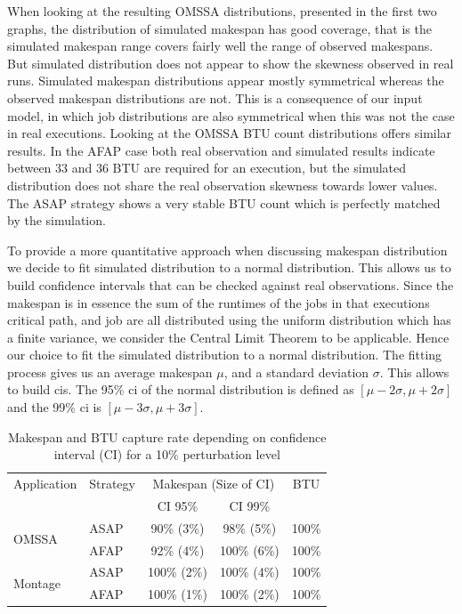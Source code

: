 \documentclass[10pt,conference,compsocconf]{IEEEtran}
\begin{document}
When looking at the resulting OMSSA distributions, presented in the first two
graphs, the distribution of simulated makespan has good coverage, that is the
simulated makespan range covers fairly well the range of observed makespans. But
simulated distribution does not appear to show the skewness observed in real
runs. Simulated makespan distributions appear mostly symmetrical whereas the
observed makespan distributions are not. This is a consequence of our input
model, in which job distributions are also symmetrical when this was not the
case in real executions. Looking at the OMSSA BTU count distributions offers
similar results.  In the AFAP case both real observation and simulated results
indicate between 33 and 36 BTU are required for an execution, but the simulated
distribution does not share the real observation skewness towards lower values.
The ASAP strategy shows a very stable BTU count which is perfectly matched by
the simulation.

To provide a more quantitative approach when discussing makespan distribution we
decide to fit simulated distribution to a normal distribution. This allows us to
build confidence intervals that can be checked against real observations.  Since
the makespan is in essence the sum of the runtimes of the jobs in that
executions critical path, and job are all distributed using the uniform
distribution which has a finite variance, we consider the Central Limit Theorem
to be applicable. Hence our choice to fit the simulated distribution to a normal
distribution. The fitting process gives us an average makespan $\mu{}$, and a
standard deviation $\sigma{}$. This allows to build \acp{ci}. The 95\% \ac{ci}
of the normal distribution is defined as $[\mu{}-2\sigma{},\mu{}+2\sigma{}]$ and
the 99\% \ac{ci} is $[\mu{}-3\sigma{},\mu{}+3\sigma{}]$.

\begin{table}
	\centering
	\caption{Makespan and BTU capture rate depending on confidence interval
          (CI) for a 10\% perturbation level}\label{tab:fit}
	\begin{tabular}{llccc}
		\toprule
		Application&Strategy&\multicolumn{2}{c}{Makespan (Size of CI)}&BTU\\
                           &         & CI 95\% & CI 99\% &\\
		\midrule
		\multirow{2}{*}{OMSSA}&ASAP&  90\% (3\%)&  98\% (5\%)& 100\%\\
				      &AFAP&  92\% (4\%)& 100\% (6\%)& 100\%\\
		\midrule
		\multirow{2}{*}{Montage}&ASAP& 100\% (2\%)& 100\% (4\%)& 100\%\\
					&AFAP& 100\% (1\%)& 100\% (2\%)& 100\%\\
		\bottomrule
	\end{tabular}
\end{table}
\end{document}
